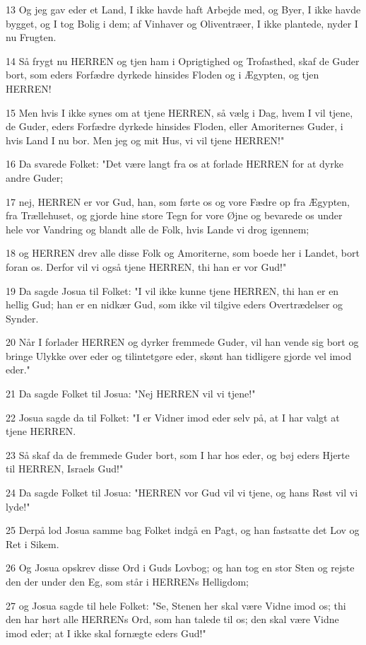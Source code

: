 \par 13 Og jeg gav eder et Land, I ikke havde haft Arbejde med, og Byer, I ikke havde bygget, og I tog Bolig i dem; af Vinhaver og Oliventræer, I ikke plantede, nyder I nu Frugten.
\par 14 Så frygt nu HERREN og tjen ham i Oprigtighed og Trofasthed, skaf de Guder bort, som eders Forfædre dyrkede hinsides Floden og i Ægypten, og tjen HERREN!
\par 15 Men hvis I ikke synes om at tjene HERREN, så vælg i Dag, hvem I vil tjene, de Guder, eders Forfædre dyrkede hinsides Floden, eller Amoriternes Guder, i hvis Land I nu bor. Men jeg og mit Hus, vi vil tjene HERREN!"
\par 16 Da svarede Folket: "Det være langt fra os at forlade HERREN for at dyrke andre Guder;
\par 17 nej, HERREN er vor Gud, han, som førte os og vore Fædre op fra Ægypten, fra Trællehuset, og gjorde hine store Tegn for vore Øjne og bevarede os under hele vor Vandring og blandt alle de Folk, hvis Lande vi drog igennem;
\par 18 og HERREN drev alle disse Folk og Amoriterne, som boede her i Landet, bort foran os. Derfor vil vi også tjene HERREN, thi han er vor Gud!"
\par 19 Da sagde Josua til Folket: "I vil ikke kunne tjene HERREN, thi han er en hellig Gud; han er en nidkær Gud, som ikke vil tilgive eders Overtrædelser og Synder.
\par 20 Når I forlader HERREN og dyrker fremmede Guder, vil han vende sig bort og bringe Ulykke over eder og tilintetgøre eder, skønt han tidligere gjorde vel imod eder."
\par 21 Da sagde Folket til Josua: "Nej HERREN vil vi tjene!"
\par 22 Josua sagde da til Folket: "I er Vidner imod eder selv på, at I har valgt at tjene HERREN.
\par 23 Så skaf da de fremmede Guder bort, som I har hos eder, og bøj eders Hjerte til HERREN, Israels Gud!"
\par 24 Da sagde Folket til Josua: "HERREN vor Gud vil vi tjene, og hans Røst vil vi lyde!"
\par 25 Derpå lod Josua samme bag Folket indgå en Pagt, og han fastsatte det Lov og Ret i Sikem.
\par 26 Og Josua opskrev disse Ord i Guds Lovbog; og han tog en stor Sten og rejste den der under den Eg, som står i HERRENs Helligdom;
\par 27 og Josua sagde til hele Folket: "Se, Stenen her skal være Vidne imod os; thi den har hørt alle HERRENs Ord, som han talede til os; den skal være Vidne imod eder; at I ikke skal fornægte eders Gud!"
